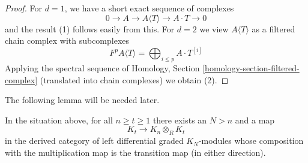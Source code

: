 \begin{proof}
For $d = 1$, we have a short exact sequence of complexes
$$
0 \to A \to A\langle T \rangle \to A \cdot T \to 0
$$
and the result (1) follows easily from this. For $d = 2$ we view
$A\langle T \rangle$ as a filtered chain complex with subcomplexes
$$
F^pA\langle T \rangle = \bigoplus\nolimits_{i \leq p} A \cdot T^{[i]}
$$
Applying the spectral sequence of
Homology, Section \ref{homology-section-filtered-complex}
(translated into chain complexes) we obtain (2).
\end{proof}

\noindent
The following lemma will be needed later.

\begin{lemma}
\label{lemma-construct-some-maps}
In the situation above, for all $n \geq t \geq 1$ there exists an $N > n$
and a map
$$
K_t \longrightarrow K_n \otimes_R K_t
$$
in the derived category of left differential graded $K_N$-modules
whose composition with the multiplication map is the transition map
(in either direction).
\end{lemma}

